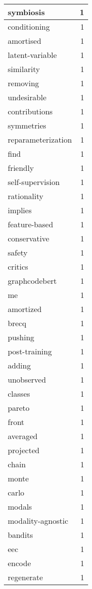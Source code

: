 \begin{table}[h]
\begin{tabular}{|l|r|}
\hline
symbiosis & 1 \\
\hline
conditioning & 1 \\
\hline
amortised & 1 \\
\hline
latent-variable & 1 \\
\hline
similarity & 1 \\
\hline
removing & 1 \\
\hline
undesirable & 1 \\
\hline
contributions & 1 \\
\hline
symmetries & 1 \\
\hline
reparameterization & 1 \\
\hline
find & 1 \\
\hline
friendly & 1 \\
\hline
self-supervision & 1 \\
\hline
rationality & 1 \\
\hline
implies & 1 \\
\hline
feature-based & 1 \\
\hline
conservative & 1 \\
\hline
safety & 1 \\
\hline
critics & 1 \\
\hline
graphcodebert & 1 \\
\hline
me & 1 \\
\hline
amortized & 1 \\
\hline
brecq & 1 \\
\hline
pushing & 1 \\
\hline
post-training & 1 \\
\hline
adding & 1 \\
\hline
unobserved & 1 \\
\hline
classes & 1 \\
\hline
pareto & 1 \\
\hline
front & 1 \\
\hline
averaged & 1 \\
\hline
projected & 1 \\
\hline
chain & 1 \\
\hline
monte & 1 \\
\hline
carlo & 1 \\
\hline
modals & 1 \\
\hline
modality-agnostic & 1 \\
\hline
bandits & 1 \\
\hline
eec & 1 \\
\hline
encode & 1 \\
\hline
regenerate & 1 \\

\end{tabular}
\end{table}
